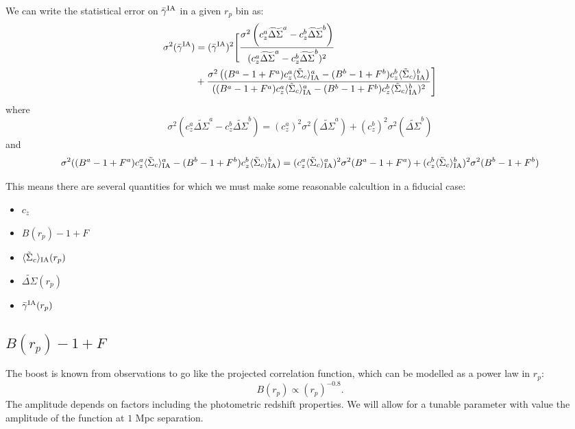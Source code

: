\documentclass[onecolumn,amsmath,aps,fleqn, superscriptaddress]{revtex4}
\begin{document}
We can write the statistical error on $\bar{\gamma}^{\rm IA}$ in a given $r_p$ bin as:
\begin{align}
\sigma^2(\bar{\gamma}^{\rm IA}) &= (\bar{\gamma}^{\rm IA})^2 \Bigg[\frac{\sigma^2\left(c_z^a \widetilde{\Delta\Sigma}^a - c_z^b \widetilde{\Delta\Sigma}^b\right)}{(c_z^a \widetilde{\Delta\Sigma}^a - c_z^b \widetilde{\Delta\Sigma}^b)^2} \nonumber \\ &+ \frac{\sigma^2\left((B^a-1+F^a)c_z^a \langle \tilde{\Sigma}_c\rangle_{\rm IA}^a - (B^b-1+F^b)c_z^b \langle \tilde{\Sigma}_c\rangle_{\rm IA}^b\right)}{((B^a-1+F^a)c_z^a \langle \tilde{\Sigma}_c\rangle_{\rm IA}^a - (B^b-1+F^b)c_z^b \langle \tilde{\Sigma}_c\rangle_{\rm IA}^b)^2} \Bigg] 
\label{siggam}
\end{align}
where
\begin{equation}
\sigma^2(c_z^a \widetilde{\Delta\Sigma}^a  - c_z^b \widetilde{\Delta\Sigma}^b) = (c_z^a)^2  \sigma^2 (\widetilde{\Delta\Sigma}^a) + (c_z^b)^2\sigma^2(\widetilde{\Delta\Sigma}^b)
\label{sigtop}
\end{equation}
and 
\begin{equation}
\sigma^2((B^a-1+F^a)c_z^a \langle \tilde{\Sigma}_c\rangle_{\rm IA}^a - (B^b-1+F^b)c_z^b \langle \tilde{\Sigma}_c\rangle_{\rm IA}^b) = (c_z^a \langle \tilde{\Sigma}_c\rangle_{\rm IA}^a)^2 \sigma^2(B^a-1+F^a) + (c_z^b \langle \tilde{\Sigma}_c\rangle_{\rm IA}^b)^2 \sigma^2(B^b-1+F^b)
\label{sigbottom}
\end{equation}

This means there are several quantities for which we must make some reasonable calcultion in a fiducial case:
\begin{itemize}
\item{$c_z$}
\item{$B(r_p)-1+F$ }
\item{$\langle \tilde{\Sigma}_c\rangle_{\rm IA}(r_p)$}
\item{$\widetilde{\Delta\Sigma}(r_p)$ }
\item{$\bar{\gamma}^{\rm IA}(r_p)$ }
\end{itemize}

\subsection*{$B(r_p)-1+F$}

The boost is known from observations to go like the projected correlation function, which can be modelled as a power law in $r_p$: 
\begin{equation}
B(r_p) \propto (r_p)^{-0.8}.
\label{boost}
\end{equation}
The amplitude depends on factors including the photometric redshift properties. We will allow for a tunable parameter with value the amplitude of the function at $1$ Mpc separation.
\end{document}
